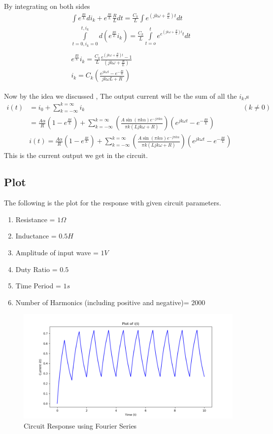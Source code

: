 By integrating on both sides
\begin{align*}
&\int e^{\frac{Rt}{L}} di_k + e^{\frac{Rt}{L}} \frac{R}{L} dt = \frac{C_k}{L}\int e^{(jk \omega +\frac{R}{L})t} dt \\
&\int\limits_{t=0,i_k=0}^{t,i_k} d(e^{\frac{Rt}{L}}i_k) = \frac{C_k}{L}\int\limits_{t=o}^{t} e^{e^{(jk \omega +\frac{R}{L})t}t} dt \\ \\
& e^{\frac{Rt}{L}}i_k = \frac{C_k}{L} \frac{e^{(jk \omega +\frac{R}{L})t} - 1}{(jk \omega +\frac{R}{L})} \\ 
& \boxed{i _k = C_k(\frac{e^{jk\omega t } - e^{-\frac{Rt}{L}}}{jk \omega L + R})}
\end{align*}




Now by the idea we discussed , The output current will be the sum of all the $i_k$,s 
\begin{align*}
i(t) &= i_0 + \sum\limits_{k= -\infty}^{k = \infty} i_k &&(k \neq 0) \\
& =\frac{A \alpha}{R}(1 - e^{\frac{Rt}{L}}) + \sum\limits_{k= -\infty}^{k = \infty}(\frac{A \sin{(\pi k \alpha)}e^{-j \pi k \alpha}}{\pi k (Ljk\omega + R)})(e^{jk\omega t } - e^{-\frac{Rt}{L}}) \\
& \boxed{i(t) = \frac{A \alpha}{R} (1 - e^{\frac{Rt}{L}})+ \sum\limits_{k= -\infty}^{k = \infty}(\frac{A \sin{(\pi k \alpha)}e^{-j \pi k \alpha}}{\pi k (Ljk\omega + R)})(e^{jk\omega t } - e^{-\frac{Rt}{L}})}
\end{align*}
This is the current output we get in the circuit.
\subsection{Plot}
The following is the plot for the response with given circuit parameters.
\begin{enumerate}
    \item Resistance = $1 \Omega$
    \item Inductance = $0.5 H$
    \item Amplitude of input wave = $1 V$
    \item Duty Ratio = $0.5$
    \item Time Period = $1 s$
    \item Number of Harmonics (including positive and negative)= $2000$
\end{enumerate}
\begin{figure}
    \centering
    \includegraphics[width=0.8\linewidth]{figs/complete-fourier.png}
    \caption{Circuit Response using Fourier Series}
    \label{fig:enter-label}
\end{figure}